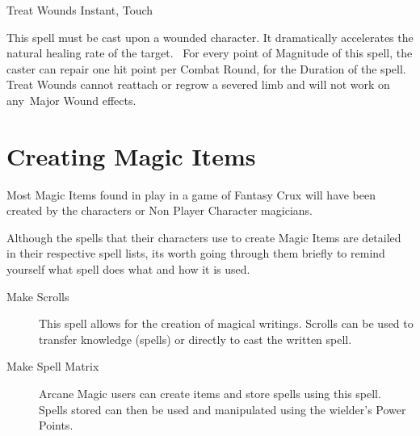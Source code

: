 

\begin{rpg-spell}
{Treat Wounds}
{Instant, Touch}

This spell must be cast upon a wounded character. It dramatically accelerates the natural healing rate of the target.  For every point of Magnitude of this spell, the caster can repair one hit point per Combat Round, for the Duration of the spell. Treat Wounds cannot reattach or regrow a severed limb and will not work on any Major Wound effects. 
\end{rpg-spell}


%


\section{Creating Magic Items}
Most Magic Items found in play in a game of Fantasy Crux will have been created by the characters or Non Player Character magicians.

Although the spells that their characters use to create Magic Items are detailed in their respective spell lists, its worth going through them briefly to remind yourself what spell does what and how it is used.

\begin{description}
\item [Make Scrolls] This spell allows for the creation of magical writings. Scrolls can be used to transfer knowledge (spells) or directly to cast the written spell.
\item [Make Spell Matrix] Arcane Magic users can create items and store spells using this spell. Spells stored can then be used and manipulated using the wielder's Power Points.
\end{description}


